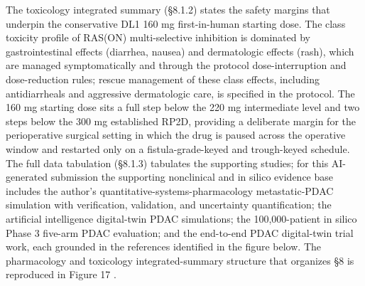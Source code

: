The toxicology integrated summary (\S 8.1.2) states the safety margins that
underpin the conservative DL1 160 mg first-in-human starting dose. The class
toxicity profile of RAS(ON) multi-selective inhibition is dominated by
gastrointestinal effects (diarrhea, nausea) and dermatologic effects (rash), which
are managed symptomatically and through the protocol dose-interruption and
dose-reduction rules; rescue management of these class effects, including
antidiarrheals and aggressive dermatologic care, is specified in the protocol. The
160 mg starting dose sits a full step below the 220 mg intermediate level and two
steps below the 300 mg established RP2D, providing a deliberate margin for the
perioperative surgical setting in which the drug is paused across the operative
window and restarted only on a fistula-grade-keyed and trough-keyed schedule. The
full data tabulation (\S 8.1.3) tabulates the supporting studies; for this
AI-generated submission the supporting nonclinical and in silico evidence base
includes the author's quantitative-systems-pharmacology metastatic-PDAC simulation
with verification, validation, and uncertainty quantification; the artificial
intelligence digital-twin PDAC simulations; the 100,000-patient in silico Phase 3
five-arm PDAC evaluation; and the end-to-end PDAC digital-twin trial work, each
grounded in the references identified in the figure below. The pharmacology and
toxicology integrated-summary structure that organizes \S 8 is reproduced in
Figure 17 \cite{qspmetpancre,fdadigtwinpc,pdacdigtwinp,chatgpt100kp}.

